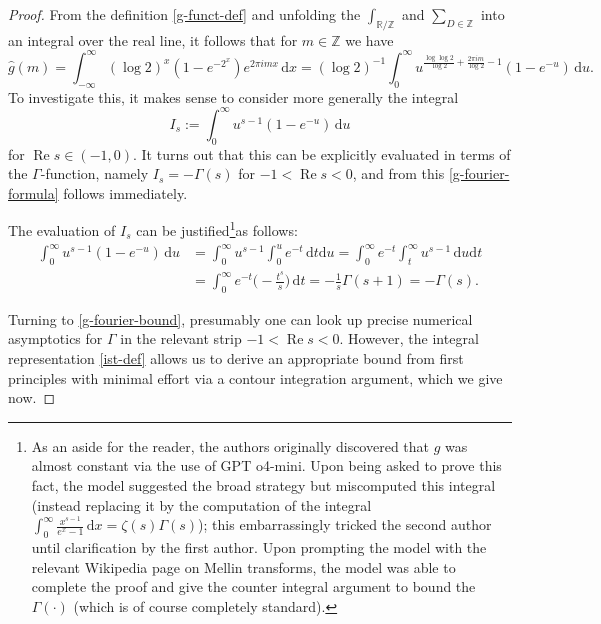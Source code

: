 \documentclass[11pt,reqno]{amsart}
\numberwithin{equation}{section}
\theoremstyle{definition}
\theoremstyle{remark}
\newcommand{\on}{\operatorname}
\newcommand{\wh}{\widehat}
\renewcommand{\Re}{\on{Re}}
\newcommand\Z{\mathbb{Z}}
\newcommand\R{\mathbb{R}}
\begin{document}
\begin{proof} From the definition \cref{g-funct-def} and unfolding the $\int_{\R/\Z}$ and $\sum_{D \in \Z}$ into an integral over the real line, it follows that for $m \in \Z$ we have
\[
\wh{g}(m) = \int^{\infty}_{-\infty} (\log 2)^x (1 - e^{-2^{x}}) e^{2\pi i m x} \, \mathrm{d}x  = (\log 2)^{-1}\int^{\infty}_0 u^{\frac{\log \log 2}{\log 2} + \frac{2\pi i m}{\log 2} - 1} (1 - e^{-u})\, \mathrm{d}u    . 
\]
To investigate this, it makes sense to consider more generally the integral
 \begin{equation}\label{ist-def} I_{s} := \int_{0}^{\infty}u^{s - 1}(1-e^{-u})\, \mathrm{d}u\end{equation}
 for $\Re s \in (-1,0)$. It turns out that this can be explicitly evaluated in terms of the $\Gamma$-function, namely $I_{s} = {-}\Gamma(s)$ for $-1 < \Re s < 0$, and from this \cref{g-fourier-formula} follows immediately.
 
The evaluation of $I_s$ can be justified\footnote{
As an aside for the reader, the authors originally discovered that $g$ was almost constant via the use of GPT o4-mini. Upon being asked to prove this fact, the model suggested the broad strategy but miscomputed this integral (instead replacing it by the computation of the integral $\int_{0}^{\infty}\frac{x^{s-1}}{e^{x}-1}\, \mathrm{d}x = \zeta(s)\Gamma(s)$); this embarrassingly tricked the second author until clarification by the first author. Upon prompting the model with the relevant Wikipedia page on Mellin transforms, the model was able to complete the proof and give the counter integral argument to bound the $\Gamma(\cdot)$ (which is of course completely standard). }as follows:
\begin{align*}
\int^{\infty}_0 u^{s-1} (1 - e^{-u}) \, \mathrm{d}u &  = \int^{\infty}_0 u^{s-1} \int^u_0 e^{-t} \, \mathrm{d}t \mathrm{d}u   = \int^{\infty}_0 e^{-t} \int^{\infty}_t u^{s-1} \, \mathrm{d}u \mathrm{d}t \\ & = \int^{\infty}_0 e^{-t} \big(-\frac{t^s}{s}\big)\, \mathrm{d}t  = {-}\frac{1}{s}\Gamma(s+1) = {-}\Gamma(s).
\end{align*}  

Turning to \cref{g-fourier-bound}, presumably one can look up precise numerical asymptotics for $\Gamma$ in the relevant strip $-1 < \Re s < 0$. However, the integral representation \cref{ist-def} allows us to derive an appropriate bound from first principles with minimal effort via a contour integration argument, which we give now. 
 

\end{proof}
\end{document}
